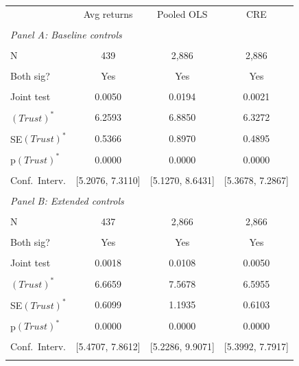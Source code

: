 \def\sym#1{\ifmmode^{#1}\else\(^{#1}\)\fi}
\begin{tabular*}{\linewidth}{@{\hskip\tabcolsep\extracolsep\fill}l*{3}{c}}\toprule
 & Avg returns & Pooled OLS & CRE \\\\ \midrule
\multicolumn{4}{l}{\textit{Panel A: Baseline controls}} \\\\
N & 439 & 2,886 & 2,886 \\\\
Both sig? & Yes & Yes & Yes \\\\
Joint test & 0.0050 & 0.0194 & 0.0021 \\\\
\((\textit{Trust})^*\) & 6.2593 & 6.8850 & 6.3272 \\\\
SE\((\textit{Trust})^*\) & 0.5366 & 0.8970 & 0.4895 \\\\
p\((\textit{Trust})^*\) & 0.0000 & 0.0000 & 0.0000 \\\\
Conf.\ Interv. & [5.2076, 7.3110] & [5.1270, 8.6431] & [5.3678, 7.2867] \\\\
\midrule
\multicolumn{4}{l}{\textit{Panel B: Extended controls}} \\\\
N & 437 & 2,866 & 2,866 \\\\
Both sig? & Yes & Yes & Yes \\\\
Joint test & 0.0018 & 0.0108 & 0.0050 \\\\
\((\textit{Trust})^*\) & 6.6659 & 7.5678 & 6.5955 \\\\
SE\((\textit{Trust})^*\) & 0.6099 & 1.1935 & 0.6103 \\\\
p\((\textit{Trust})^*\) & 0.0000 & 0.0000 & 0.0000 \\\\
Conf.\ Interv. & [5.4707, 7.8612] & [5.2286, 9.9071] & [5.3992, 7.7917] \\\\
\bottomrule
\end{tabular*}
